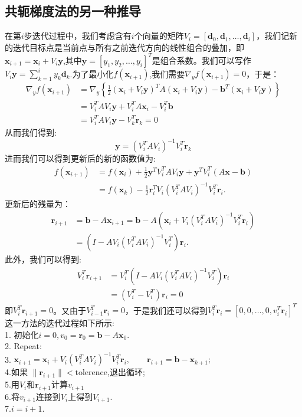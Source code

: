 \documentclass{ctexart}
\begin{document}
\subsection{共轭梯度法的另一种推导}
在第$i$步迭代过程中，我们考虑含有$i$个向量的矩阵$V_i=[\mathbf{d}_0,\mathbf{d}_1,\dots,\mathbf{d}_i]$，我们记新的迭代目标点是当前点与所有之前迭代方向的线性组合的叠加，即$\mathbf{x}_{i+1}=\mathbf{x}_i+V_i\mathbf{y}$,其中$\mathbf{y}=[y_1,y_2,\dots,y_i]^T$是组合系数。我们可以写作$V_i\mathbf{y}=\sum_{k=1}^{i}y_k\mathbf{d}_k$.为了最小化$f(\mathbf{x}_{i+1})$,我们需要$\nabla_yf(\mathbf{x}_{i+1})=0$，于是：
\begin{align*}
\nabla_yf(\mathbf{x}_{i+1})&=\nabla_y\left\{\frac{1}{2}(\mathbf{x}_i+V_i\mathbf{y})^TA(\mathbf{x}_i+V_i\mathbf{y})-\mathbf{b}^T(\mathbf{x}_i+V_i\mathbf{y})\right\}\\
&=V_i^TAV_i\mathbf{y}+V_i^TA\mathbf{x}_i-V_i^T\mathbf{b}\\
&=V_i^TAV_i\mathbf{y}-V_k^T\mathbf{r}_k=0
\end{align*}
从而我们得到:
\begin{equation}
\mathbf{y}=(V_i^TAV_i)^{-1}V_i^T\mathbf{r}_k
\end{equation}
进而我们可以得到更新后的新的函数值为:
\begin{align*}
f(\mathbf{x}_{i+1})&=f(\mathbf{x}_i)+\frac{1}{2}\mathbf{y}^TV_i^TAV_i\mathbf{y}+\mathbf{y}^TV_i^T(A\mathbf{x}-\mathbf{b})\\
&=f(\mathbf{x}_k)-\frac{1}{2}\mathbf{r}_i^TV_i(V_i^TAV_i)^{-1}V_i^T\mathbf{r}_i.
\end{align*}
更新后的残量为：
\begin{align*}
\mathbf{r}_{i+1} &= \mathbf{b}-A\mathbf{x}_{i+1}=\mathbf{b}-A(\mathbf{x}_i+V_i(V_i^TAV_i)^{-1}V_i^T\mathbf{r}_i)\\
&=(I-AV_i(V_i^TAV_i)^{-1}V_i^T)\mathbf{r}_i.
\end{align*}
此外，我们可以得到:
\begin{align*}
V_i^T\mathbf{r}_{i+1}&=V_i^T(I-AV_i(V_i^TAV_i)^{-1}V_i^T)\mathbf{r}_i\\
&=(V_i^T-V_i^T)\mathbf{r}_i=0
\end{align*}
即$V_i^T\mathbf{r}_{i+1}=0$。又由于$V_{i-1}^T\mathbf{r}_{i}=0$，于是我们还可以得到$V_i^T\mathbf{r}_i=[0,0,\dots,0,v_i^T\mathbf{r}_i]^T$
这一方法的迭代过程如下所示:\\
1. 初始化$i=0,v_0=\mathbf{r}_0=\mathbf{b}-A\mathbf{x}_0.$\\
2. Repeat:\\
3. \qquad $\mathbf{x}_{i+1}=\mathbf{x}_i+V_i(V_i^TAV_i)^{-1}V_i^T\mathbf{r}_i,\qquad\mathbf{r}_{i+1}=\mathbf{b}-\mathbf{x}_{k+1};$\\
4.\qquad 如果 $\|\mathbf{r}_{i+1}\|<\text{tolerence}$,退出循环;\\
5.\qquad 用$V_i$和$\mathbf{r}_{i+1}$计算$v_{i+1}$\\
6.\qquad 将$v_{i+1}$连接到$V_i$上得到$V_{i+1}$.\\
7.\qquad $i = i+1.$
\end{document}
